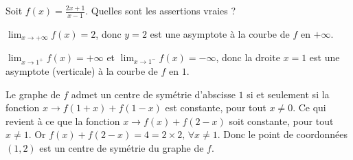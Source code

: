 \begin{question} 

Soit $ f(x)= \frac{2x+1}{x-1}$. Quelles sont les assertions vraies ?
\begin{answers}



\end{answers}
\begin{explanations}
$\lim_{x\to +\infty}f(x)=2$, donc $y=2$ est une asymptote à la courbe de $f$ en $+\infty$.

$\lim_{x\to 1^+}f(x)=+\infty$ et $\lim_{x\to 1^-}f(x)=-\infty$, donc la droite $x=1$ est une asymptote (verticale) à la courbe de $f$ en $1$.

Le graphe de $f$ admet un centre de symétrie d'abscisse $1$ si et seulement si la fonction $x\to f(1+x)+f(1-x)$ est constante, pour tout $x\neq 0$. Ce qui revient à ce que la fonction $x\to f(x)+f(2-x)$ soit constante, pour tout $x\neq 1$. Or $f(x)+f(2-x)=4=2\times 2, \, \forall x \neq 1$. Donc le point de coordonnées $(1,2)$ est un centre de symétrie du graphe de $f$.
\end{explanations}

\end{question}



